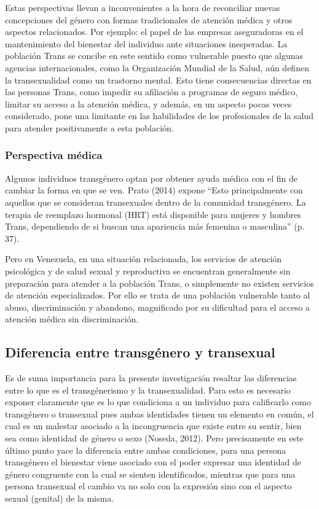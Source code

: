 Estas perspectivas llevan a inconvenientes a la hora de reconciliar nuevas
concepciones del género con formas tradicionales de atención médica y otros
aspectos relacionados.
Por ejemplo: el papel de las empresas aseguradoras en el mantenimiento del
bienestar del individuo ante situaciones inesperadas.
La población Trans se concibe en este sentido como vulnerable puesto que algunas
agencias internacionales, como la Organización Mundial de la Salud, aún definen
la transexualidad como un trastorno mental.
Esto tiene consecuencias directas en las personas Trans, como impedir su
afiliación a programas de seguro médico, limitar su acceso a la atención médica,
y además, en un aspecto pocas veces considerado, pone una limitante en las
habilidades de los profesionales de la salud para atender positivamente a esta
población.

\subsubsection{Perspectiva médica}
Algunos individuos transgénero optan por obtener ayuda médica con el fin de
cambiar la forma en que se ven.
Prato (2014) expone “Esto principalmente con aquellos que se consideran
transexuales dentro de la comunidad transgénero.
La terapia de reemplazo hormonal (HRT) está disponible para mujeres y hombres
Trans, dependiendo de si buscan una apariencia más femenina o masculina” (p.
37).

Pero en Venezuela, en una situación relacionada, los servicios de atención
psicológica y de salud sexual y reproductiva se encuentran generalmente sin
preparación para atender a la población Trans, o simplemente no existen
servicios de atención especializados.
Por ello se trata de una población vulnerable tanto al abuso, discriminación y
abandono, magnificado por su dificultad para el acceso a atención médica sin
discriminación.

\subsection{Diferencia entre transgénero y transexual}\label{diferencia}
Es de suma importancia para la presente investigación resaltar las diferencias
entre lo que es el transgénerismo y la transexualidad.
Para esto es necesario exponer claramente que es lo que condiciona a un
individuo para calificarlo como transgénero o transexual pues ambas identidades
tienen un elemento en común, el cual es un malestar asociado a la incongruencia
que existe entre su sentir, bien sea como identidad de género o sexo (Noseda,
2012).
Pero precisamente en este último punto yace la diferencia entre ambas
condiciones, para una persona transgénero el bienestar viene asociado con el
poder expresar una identidad de género congruente con la cual se sienten
identificados, mientras que para una persona transexual el cambio va no solo con
la expresión sino con el aspecto sexual (genital) de la misma.

